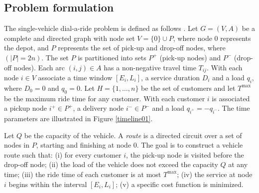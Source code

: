 \documentclass[dissertation,draft*]{aaltoseries}
\begin{document}
% 
% 

\subsection{Problem formulation}
\label{staticnarrow}
The single-vehicle dial-a-ride problem is defined as follows \citep{berbegliafeas}. 
Let $G = (V, A)$ be a complete and directed graph
with node set $V = \{0\} \cup P$, where node $0$ represents the depot, and $P$ represents 
the set of pick-up and drop-off nodes, where  $(|P| = 2n)$. The set $P$ is partitioned into sets $P^{+}$ (pick-up nodes) and
$P^{-}$ (drop-off nodes). Each arc $(i, j) \in A$ has a non-negative travel time $T_{ij}$. 
With each node $i \in V$ associate a time window $[E_i , L_i ]$,
a service duration $D_i$ and a load $q_i$, where $D_0 = 0$ and $q_0 = 0$. Let $H = \{1, \ldots , n\}$ be
the set of customers and let $T^{\max}$ be the maximum ride time for any customer. With each customer $i$ is associated
a pickup node $i^{+} \in P^{+}$, a delivery node $i^{-} \in P^{-}$ and a load $q_{i^+} = -q_{i^-}$. 
The time parameters are illustrated in Figure \ref{timeline01}.

Let $Q$ be the capacity of the vehicle. 
A \emph{route} is a directed circuit over a set of nodes in $P$, starting and finishing at node $0$. The goal is to construct a
vehicle route such that: (i) for every customer $i$, the pick-up node is visited before the drop-off node;
(ii) the load of the vehicle does not exceed the capacity $Q$ at any time;
(iii) the ride time of each customer is at most $T^{\max}$;
(iv) the service at node $i$ begins within the interval $[E_i , L_i]$;
(v) a specific cost function is minimized.
\end{document}
